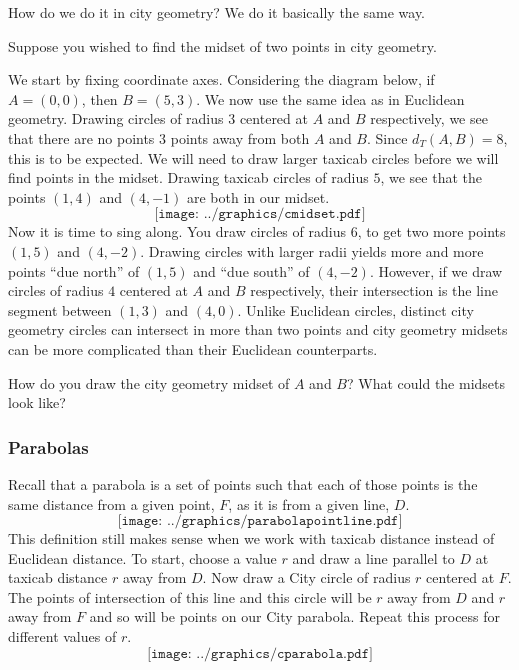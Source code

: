 How do we do it in city geometry? We do it basically the same way.

\begin{example} Suppose you wished to find the midset of two points in city geometry.

We start by fixing coordinate axes. Considering the diagram below, if
$A=(0,0)$, then $B=(5,3)$. We now use the same idea as in Euclidean
geometry. Drawing circles of radius $3$ centered at $A$ and $B$
respectively, we see that there are no points $3$ points away from
both $A$ and $B$. Since $d_T(A,B)=8$, this is to be expected. We will
need to draw larger taxicab circles before we will find points in the
midset. Drawing taxicab circles of radius $5$, we see that the points
$(1,4)$ and $(4,-1)$ are both in our midset.
\[
\texttt{[image: ../graphics/cmidset.pdf]}
\]
Now it is time to sing along. You draw circles of radius $6$, to get
two more points $(1,5)$ and $(4,-2)$. Drawing circles with larger
radii yields more and more points ``due north'' of $(1,5)$ and ``due
south'' of $(4,-2)$. However, if we draw circles of radius $4$
centered at $A$ and $B$ respectively, their intersection is the line
segment between $(1,3)$ and $(4,0)$. Unlike Euclidean circles,
distinct city geometry circles can intersect in more than two points and
city geometry midsets can be more complicated than their Euclidean
counterparts. 
\end{example}

\begin{question}How do you draw the city geometry midset of $A$ and
$B$? What could the midsets look like?
\end{question}
\QM






\subsubsection{Parabolas}


Recall that a parabola is a set of points such that each of those
points is the same distance from a given point, $F$, as it is from a
given line, $D$. 
\[
\texttt{[image: ../graphics/parabolapointline.pdf]}
\]
This definition still makes sense when we work with taxicab distance
instead of Euclidean distance. To start, choose a value $r$ and draw a
line parallel to $D$ at taxicab distance $r$ away from $D$. Now draw a
City circle of radius $r$ centered at $F$. The points of intersection
of this line and this circle will be $r$ away from $D$ and $r$ away
from $F$ and so will be points on our City parabola. Repeat this
process for different values of $r$. 
\[
\texttt{[image: ../graphics/cparabola.pdf]}
\]


